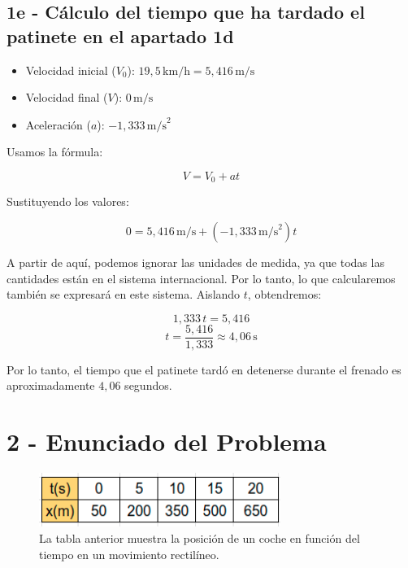 \documentclass{article}
\begin{document}
\subsection*{1e - Cálculo del tiempo que ha tardado el patinete en el apartado 1d}


\begin{itemize}
    \item Velocidad inicial (\( V_0 \)): \( 19,5 \, \text{km/h} = 5,416 \, \text{m/s} \)
    \item Velocidad final (\( V \)): \( 0 \, \text{m/s} \)
    \item Aceleración (\( a \)): \( -1,333 \, \text{m/s}^2 \)
\end{itemize}

Usamos la fórmula:

\[
V = V_0 + at
\]

Sustituyendo los valores:

\[
0 = 5,416 \, \text{m/s} + (-1,333 \, \text{m/s}^2) t 
\]

\justify
A partir de aquí, podemos ignorar las unidades de medida, ya que todas las cantidades están en el sistema internacional. Por lo tanto, lo que calcularemos también se expresará en este sistema. Aislando \( t\), obtendremos:

\[
1,333 \, t = 5,416 
\]
\[
t = \frac{5,416}{1,333} \approx \boxed{4,06 \, \text{s}}
\]

\justify
Por lo tanto, el tiempo que el patinete tardó en detenerse durante el frenado es aproximadamente \( 4,06 \) segundos.

\section*{2 - Enunciado del Problema}


\begin{figure}[h] %
    \centering
    \includegraphics[width=0.7\textwidth]{tabla.png} %
    \caption{La tabla anterior muestra la posición de un coche en función del tiempo en un movimiento rectilíneo.
    }
    \label{fig:tabla}
\end{figure}\

\end{document}
